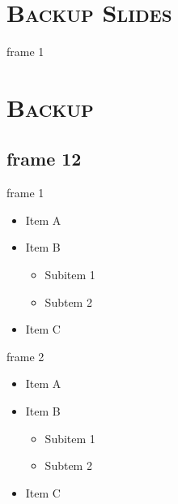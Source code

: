 \documentclass[xcolor=x11names,compress,8pt]{beamer}
\renewcommand{\(}{\begin{columns}}
\renewcommand{\)}{\end{columns}}
\newcommand{\<}[1]{\begin{column}{#1}}
\renewcommand{\>}{\end{column}}
\begin{document}

\section{\scshape Backup Slides}
\begin{frame}[noframenumbering]{frame 1}

\end{frame}

\section{\scshape Backup}
\subsection{frame 12}
\begin{frame}[noframenumbering]{frame 1}
\begin{itemize}
\item Item A
\item Item B
\begin{itemize}
\item Subitem 1
\item Subtem 2
\end{itemize}
\item Item C
\end{itemize}
\end{frame}

\begin{frame}[noframenumbering]{frame 2}
\begin{itemize}
\item Item A
\item Item B
\begin{itemize}
\item Subitem 1
\item Subtem 2
\end{itemize}
\item Item C
\end{itemize}


\end{frame}
\end{document}
